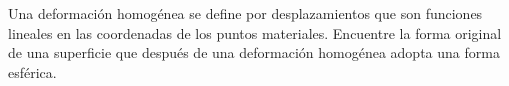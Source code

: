 \documentclass[../main.tex]{subfiles}
\begin{document}
\begin{problema}[3]
	Una deformación homogénea se define por desplazamientos que son funciones
	lineales en las coordenadas de los puntos materiales. Encuentre la forma
	original de una superficie que después de una deformación homogénea adopta
	una forma esférica.
\end{problema}
\end{document}
